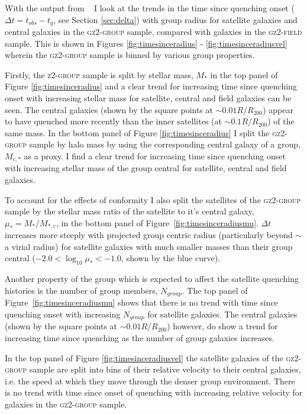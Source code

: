With the output from \starpy~ I look at the trends in the time since quenching onset ($\Delta t = t_{obs} - t_{q}$, see Section \ref{sec:delta}) with group radius for satellite galaxies and central galaxies in the \textsc{gz2-group} sample, compared with galaxies in the \textsc{gz2-field} sample. This is shown in Figures \ref{fig:timesinceradius} - \ref{fig:timesinceradiusvel} wherein the \textsc{gz2-group} sample is binned by various group properties. 

Firstly, the \textsc{z2-group} sample is split by stellar mass, $M_*$ in the top panel of Figure \ref{fig:timesinceradius} and a clear trend for increasing time since quenching onset with increasing stellar mass for satellite, central and field galaxies can be seen. The central galaxies (shown by the square points at $\sim 0.01 R/R_{200}$) appear to have quenched more recently than the inner satellites (at $\sim0.1R/R_{200}$) of the same mass. In the bottom panel of Figure \ref{fig:timesinceradius} I split the \textsc{gz2-group} sample by halo mass by using the corresponding central galaxy of a group, $M_{c,*}$ as a proxy. I find a clear trend for increasing time since quenching onset with increasing stellar mass of the group central for satellite, central and field galaxies.

To account for the effects of conformity \citep[i.e. that satellites of higher mass tend to be found in higher mass halos]{citationbomb} I also split the satellites of the \textsc{gz2-group} sample by the stellar mass ratio of the satellite to it's central galaxy, $\mu_* = M_*/M_{*,c}$, in the bottom panel of Figure~\ref{fig:timesinceradiusmu}. $\Delta t $ increases more steeply with projected group centric radius (particularly beyond $\sim$ a virial radius) for satellite galaxies with much smaller masses than their group central ($-2.0 < \log_{10}\mu_* < -1.0$, shown by the blue curve).

Another property of the group which is expected to affect the satellite quenching histories is the number of group members, $N_{group}$. The top panel of Figure~\ref{fig:timesinceradiusmu} shows that there is no trend with time since quenching onset with increasing $N_{group}$ for satellite galaxies. The central galaxies (shown by the square points at $\sim 0.01 R/R_{200}$) however, do show a trend for increasing time since quenching as the number of group galaxies increases.

In the top panel of Figure \ref{fig:timesinceradiusvel} the satellite galaxies of the \textsc{gz2-group} sample are split into bins of their relative velocity to their central galaxies, i.e. the speed at which they move through the denser group environment. There is no trend with time since onset of quenching with increasing relative velocity for galaxies in the \textsc{gz2-group} sample.

